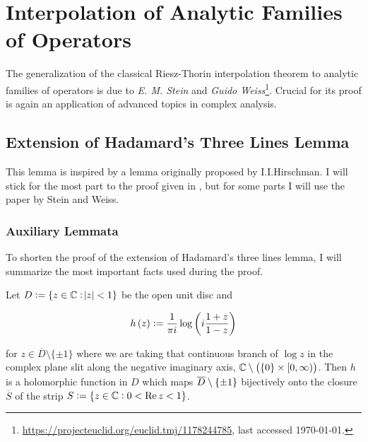 \section{Interpolation of Analytic Families of Operators}
The generalization of the classical Riesz-Thorin interpolation theorem to analytic families of operators is due to \emph{E. M. Stein} and \emph{Guido  Weiss}\footnote{\href{https://projecteuclid.org/euclid.tmj/1178244785}{https://projecteuclid.org/euclid.tmj/1178244785}, last accessed \today.}. Crucial for its proof is again an application of advanced topics in complex analysis.

\subsection{Extension of Hadamard's Three Lines Lemma}
This lemma is inspired by a lemma originally proposed by I.I.Hirschman. I will stick for the most part to the proof given in \cite[43--45]{grafakos:fourier:2014}, but for some parts I will use the paper by Stein and Weiss.


\subsubsection{Auxiliary Lemmata} To shorten the proof of the extension of Hadamard's three lines lemma, I will summarize the most important facts used during the proof.

\begin{lemma}
	Let $D := \cbr[0]{z \in \mathbb{C} : \abs{z} < 1}$ be the open unit disc and 
	
	\begin{equation*}
		h\del{z} := \frac{1}{\pi i}\log\del{i\frac{1 + z}{1 - z}}
	\end{equation*}

	for $z \in \overline{D} \setminus \{\pm 1\}$ where we are taking that continuous branch of $\log z$ in the complex plane slit along the negative imaginary axis, $\mathbb{C} \setminus \del{\cbr{0} \times \intco{0,\infty}}$. Then $h$ is a holomorphic function in $D$ which maps $\overline{D}\setminus \cbr{\pm 1}$ bijectively onto the closure $\overline{S}$ of the strip $S := \cbr{z \in \mathbb{C} : 0 < \Re z < 1}$.

	\label{lem:h}
\end{lemma}

